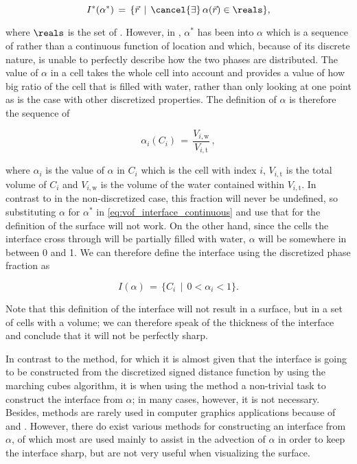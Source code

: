\begin{equation} \label{eq:vof_interface_continuous}
I^*(\alpha^*) \,=\, \{\vec{r} \,\mid\, \cancel{\exists}\,\alpha(\vec{r})\in\reals\},
\end{equation}

where $\reals$ is the set of . However, in \thisprojectwork, $\alpha^*$ has been \discretized into $\alpha$ which is a sequence of  rather than a continuous function of location and which, because of its discrete nature, is unable to perfectly describe how the two phases are distributed. The value of $\alpha$ in a cell takes the whole cell into account and provides a value of how big ratio of the cell that is filled with water, rather than only looking at one point as is the case with other discretized properties. The definition of $\alpha$ is therefore the sequence of

\begin{equation} \label{eq:phase_fraction_discretized}
\alpha_i(C_i) \,=\, \frac{V_{i,\text{w}}}{V_{i,\text{t}}}\,,
\end{equation}

where $\alpha_i$ is the value of $\alpha$ in $C_i$ which is the cell with index $i$, $V_{i,\text{t}}$ is the total volume of $C_i$ and $V_{i,\text{w}}$ is the volume of the water contained within $V_{i,\text{t}}$. In contrast to in the non-discretized case, this fraction will never be undefined, so substituting $\alpha$ for $\alpha^*$ in \eqref{eq:vof_interface_continuous} and use that for the definition of the surface will not work. On the other hand, since the cells the interface cross through will be partially filled with water, $\alpha$ will be somewhere in between 0 and 1. We can therefore define the interface using the discretized phase fraction as

\begin{equation} \label{eq:vof_interface_discrete}
I(\alpha) \,=\, \{C_i \,\mid\, 0 < \alpha_i < 1\}.
\end{equation}

Note that this definition of the interface will not result in a surface, but in a set of cells with a volume; we can therefore speak of the thickness of the interface and conclude that it will not be perfectly sharp.

In contrast to the \LS method, for which it is almost given that the interface is going to be constructed from the discretized signed distance function by using the marching cubes algorithm, it is when using the \VOF method a non-trivial task to construct the interface from $\alpha$; in many cases, however, it is not necessary. Besides, \VOF methods are rarely used in computer graphics applications because of  and  \citep{Wojtan2009}. However, there do exist various methods for constructing an interface from $\alpha$, of which most are used mainly to assist in the advection of $\alpha$ in order to keep the interface sharp, but are not very useful when visualizing the surface.

